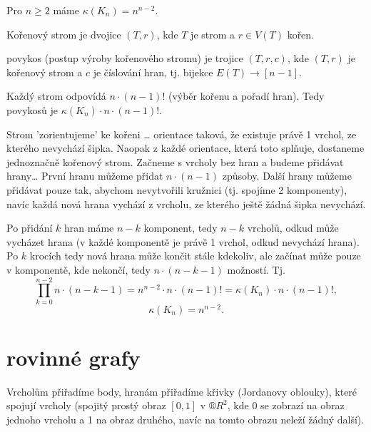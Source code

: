 \documentclass[12pt]{article}					%
\begin{document}
    \begin{veta}
        Pro $n ≥ 2$ máme $\kappa(K_n) = n^{n-2}$.

        \begin{definicein}
            Kořenový strom je dvojice $(T, r)$, kde $T$ je strom a $r \in V(T)$ kořen.
        \end{definicein}

        \begin{definicein}
            povykos (postup výroby kořenového stromu) je trojice $(T, r, c)$, kde $(T, r)$ je kořenový strom a $c$ je číslování hran, tj. bijekce $E(T) \rightarrow [n-1]$.
        \end{definicein}


        \begin{dukazin}
            Každý strom odpovídá $n·(n-1)!$ (výběr kořenu a pořadí hran). Tedy povykosů je $\kappa(K_n)·n·(n-1)!$.

            Strom 'zorientujeme' ke kořeni … orientace taková, že existuje právě 1 vrchol, ze kterého nevychází šipka. Naopak z každé orientace, která toto splňuje, dostaneme jednoznačně kořenový strom. Začneme s vrcholy bez hran a budeme přidávat hrany… První hranu můžeme přidat $n·(n-1)$ způsoby. Další hrany můžeme přidávat pouze tak, abychom nevytvořili kružnici (tj. spojíme 2 komponenty), navíc každá nová hrana vychází z vrcholu, ze kterého ještě žádná šipka nevychází.

            Po přidání $k$ hran máme $n-k$ komponent, tedy $n-k$ vrcholů, odkud může vycházet hrana (v každé komponentě je právě 1 vrchol, odkud nevychází hrana). Po $k$ krocích tedy nová hrana může končit stále kdekoliv, ale začínat může pouze v komponentě, kde nekončí, tedy $n·(n-k-1)$ možností. Tj.
            $$ \prod_{k=0}^{n-2} n·(n-k-1) = n^{n-2}·n·(n-1)! = \kappa(K_n)·n·(n-1)!, $$ 
            $$ \kappa(K_n) = n^{n-2}. $$ 
        \end{dukazin}
    \end{veta}

\section{rovinné grafy}
    \begin{definice}[Nakreslení]
        Vrcholům přiřadíme body, hranám přiřadíme křivky (Jordanovy oblouky), které spojují vrcholy (spojitý prostý obraz $[0, 1]$ v $®R^2$, kde 0 se zobrazí na obraz jednoho vrcholu a 1 na obraz druhého, navíc na tomto obrazu neleží žádný další).
    \end{definice}
\end{document}

